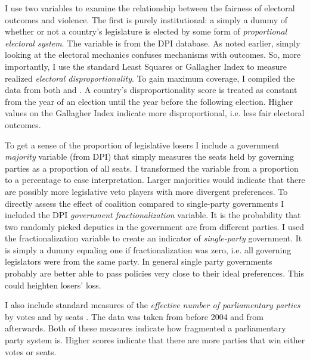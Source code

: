 \documentclass[a4paper]{article}\usepackage{graphicx, color}
\begin{document}
I use two variables to examine the relationship between the fairness of electoral outcomes and violence. The first is purely institutional: a simply a dummy of whether or not a country's legislature is elected by some form of {\emph{proportional electoral system}}. The variable is from the DPI database. As noted earlier, simply looking at the electoral mechanics confuses mechanisms with outcomes. So, more importantly, I use the standard Least Squares or Gallagher Index \citep[see][]{Gallagher1991} to measure realized {\emph{electoral disproportionality}}. To gain maximum coverage, I compiled the data from both \cite{Gallagher2012} and \cite{Carey2011}. A country's disproportionality score is treated as constant from the year of an election until the year before the following election. Higher values on the Gallagher Index indicate more disproportional, i.e. less fair electoral outcomes.

To get a sense of the proportion of legislative losers I include a government {\emph{majority}} variable (from DPI) that simply measures the seats held by governing parties as a proportion of all seats. I transformed the variable from a proportion to a percentage to ease interpretation. Larger majorities would indicate that there are possibly more legislative veto players with more divergent preferences. To directly assess the effect of coalition compared to single-party governments I included the DPI {\emph{government fractionalization}} variable. It is the probability that two randomly picked deputies in the government are from different parties. I used the fractionalization variable to create an indicator of {\emph{single-party}} government. It is simply a dummy equaling one if fractionalization was zero, i.e. all governing legislators were from the same party. In general single party governments probably are better able to pass policies very close to their ideal preferences. This could heighten losers' loss.

I also include standard measures of the \emph{effective number of parliamentary parties} by votes and by seats \citep[see][]{Laakso1979, Taagepera1989}. The data was taken from \cite{Carey2011} before 2004 and from \cite{Gallagher2012} afterwards. Both of these measures indicate how fragmented a parliamentary party system is. Higher scores indicate that there are more parties that win either votes or seats.
\end{document}
